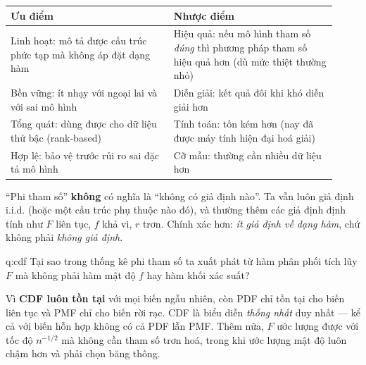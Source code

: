 \begin{center}
\begin{tabular}{@{}p{0.46\linewidth}p{0.46\linewidth}@{}}
\toprule
\textbf{Ưu điểm} & \textbf{Nhược điểm}\\
\midrule
Linh hoạt: mô tả được cấu trúc phức tạp mà không áp đặt dạng hàm & Hiệu quả: nếu mô hình tham số \emph{đúng} thì phương pháp tham số hiệu quả hơn (dù mức thiệt thường nhỏ)\\
Bền vững: ít nhạy với ngoại lai và với sai mô hình & Diễn giải: kết quả đôi khi khó diễn giải hơn\\
Tổng quát: dùng được cho dữ liệu thứ bậc (rank-based) & Tính toán: tốn kém hơn (nay đã được máy tính hiện đại hoá giải)\\
Hợp lệ: bảo vệ trước rủi ro sai đặc tả mô hình & Cỡ mẫu: thường cần nhiều dữ liệu hơn\\
\bottomrule
\end{tabular}
\end{center}

\begin{luuy}
``Phi tham số'' \textbf{không} có nghĩa là ``không có giả định nào''. Ta vẫn luôn giả định i.i.d. (hoặc một cấu trúc phụ thuộc nào đó), và thường thêm các giả định định tính như $F$ liên tục, $f$ khả vi, $r$ trơn. Chính xác hơn: \emph{ít giả định về dạng hàm}, chứ không phải \emph{không giả định}.
\end{luuy}


\begin{cauhoi}{q:cdf}
Tại sao trong thống kê phi tham số ta xuất phát từ hàm phân phối tích lũy $F$ mà không phải hàm mật độ $f$ hay hàm khối xác suất?
\end{cauhoi}

\begin{chot}
Vì \textbf{CDF luôn tồn tại} với mọi biến ngẫu nhiên, còn PDF chỉ tồn tại cho biến liên tục và PMF chỉ cho biến rời rạc. CDF là biểu diễn \emph{thống nhất} duy nhất --- kể cả với biến hỗn hợp không có cả PDF lẫn PMF. Thêm nữa, $F$ ước lượng được với tốc độ $n^{-1/2}$ mà không cần tham số trơn hoá, trong khi ước lượng mật độ luôn chậm hơn và phải chọn băng thông.
\end{chot}

